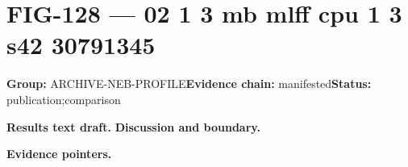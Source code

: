 \clearpage
\section{FIG-128 --- 02 1 3 mb mlff cpu 1 3 s42 30791345}
\label{figpage:fig-128}
\textbf{Group:} ARCHIVE-NEB-PROFILE\quad \textbf{Evidence chain:} manifested\quad \textbf{Status:} publication;comparison

\textbf{Results text draft.} 
\textbf{Discussion and boundary.} 


\textbf{Evidence pointers.}



\vfill
